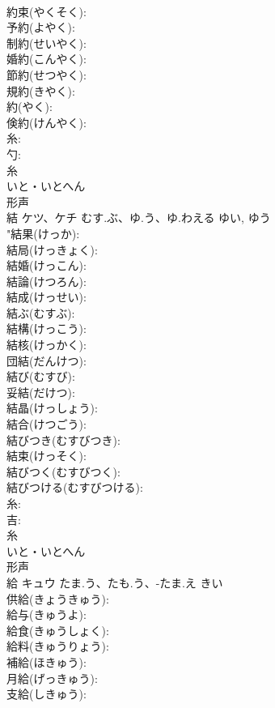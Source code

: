 \documentclass[8pt]{extreport}
\begin{document}
\begin{CJK}{UTF8}{min}
\\	約束(やくそく): 
\\	予約(よやく): 
\\	制約(せいやく): 
\\	婚約(こんやく): 
\\	節約(せつやく): 
\\	規約(きやく): 
\\	約(やく): 
\\	倹約(けんやく): 
\\	糸: 
\\	勺: 
\\	糸	
\\	いと・いとへん	
\\	形声 
\\	結	ケツ、ケチ	むす.ぶ、ゆ.う、ゆ.わえる	ゆい, ゆう	
\\	"結果(けっか): 
\\	結局(けっきょく): 
\\	結婚(けっこん): 
\\	結論(けつろん): 
\\	結成(けっせい): 
\\	結ぶ(むすぶ): 
\\	結構(けっこう): 
\\	結核(けっかく): 
\\	団結(だんけつ): 
\\	結び(むすび): 
\\	妥結(だけつ): 
\\	結晶(けっしょう): 
\\	結合(けつごう): 
\\	結びつき(むすびつき): 
\\	結束(けっそく): 
\\	結びつく(むすびつく): 
\\	結びつける(むすびつける): 
\\	糸: 
\\	吉: 
\\	糸	
\\	いと・いとへん	
\\	形声 
\\	給	キュウ	たま.う、たも.う、-たま.え	きい	
\\	供給(きょうきゅう): 
\\	給与(きゅうよ): 
\\	給食(きゅうしょく): 
\\	給料(きゅうりょう): 
\\	補給(ほきゅう): 
\\	月給(げっきゅう): 
\\	支給(しきゅう): 

\end{CJK}
\end{document}
